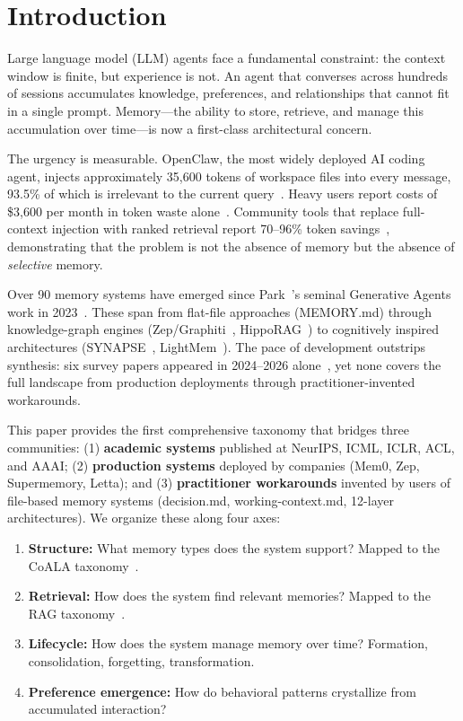 \section{Introduction}
\label{sec:introduction}

Large language model (LLM) agents face a fundamental constraint: the
context window is finite, but experience is not. An agent that
converses across hundreds of sessions accumulates knowledge,
preferences, and relationships that cannot fit in a single prompt.
Memory---the ability to store, retrieve, and manage this accumulation
over time---is now a first-class architectural concern.

The urgency is measurable. OpenClaw, the most widely deployed AI coding
agent, injects approximately 35,600 tokens of workspace files into
every message, 93.5\% of which is irrelevant to the current
query~\cite{openclaw9157}. Heavy users report costs of \$3,600 per
month in token waste alone~\cite{zilliz2026b}. Community tools that
replace full-context injection with ranked retrieval report 70--96\%
token savings~\cite{levine2026}, demonstrating that the problem is not
the absence of memory but the absence of \emph{selective} memory.

Over 90 memory systems have emerged since Park~\etal's seminal
Generative Agents work in 2023~\cite{park2023generative}. These span
from flat-file approaches (MEMORY.md) through knowledge-graph engines
(Zep/Graphiti~\cite{dempsey2025graphiti},
HippoRAG~\cite{gutierrez2024hipporag}) to cognitively inspired
architectures (SYNAPSE~\cite{jiang2026synapse},
LightMem~\cite{fang2025lightmem}). The pace of development outstrips
synthesis: six survey papers appeared in 2024--2026
alone~\cite{sumers2024coala, gao2023rag, zhang2024survey, hu2025memory,
wu2025memory, du2025memory}, yet none covers the full landscape from
production deployments through practitioner-invented workarounds.

This paper provides the first comprehensive taxonomy that bridges three
communities: (1) \textbf{academic systems} published at NeurIPS, ICML,
ICLR, ACL, and AAAI; (2) \textbf{production systems} deployed by
companies (Mem0, Zep, Supermemory, Letta); and (3)
\textbf{practitioner workarounds} invented by users of file-based
memory systems (decision.md, working-context.md, 12-layer
architectures). We organize these along four axes:

\begin{enumerate}[leftmargin=*, nosep]
    \item \textbf{Structure:} What memory types does the system
    support? Mapped to the CoALA taxonomy~\cite{sumers2024coala}.
    \item \textbf{Retrieval:} How does the system find relevant
    memories? Mapped to the RAG taxonomy~\cite{gao2023rag}.
    \item \textbf{Lifecycle:} How does the system manage memory over
    time? Formation, consolidation, forgetting, transformation.
    \item \textbf{Preference emergence:} How do behavioral patterns
    crystallize from accumulated interaction?
\end{enumerate}


